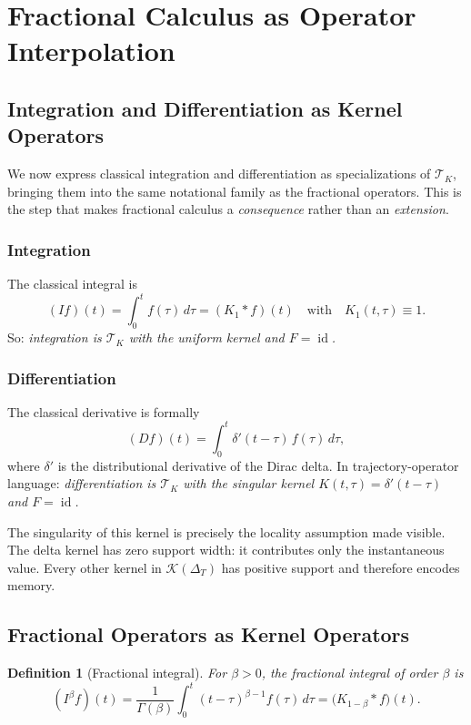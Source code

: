 \documentclass[12pt]{article}
\newtheorem{definition}[theorem]{Definition}
\DeclareMathOperator{\id}{id}
\newcommand{\Kcal}{\mathcal{K}}
\newcommand{\TK}{\mathcal{T}_K}
\begin{document}
\section{Fractional Calculus as Operator Interpolation}
\label{sec:fractal}

\subsection{Integration and Differentiation as Kernel Operators}

We now express classical integration and differentiation as specializations
of $\TK$, bringing them into the same notational family as the fractional
operators. This is the step that makes fractional calculus a
\emph{consequence} rather than an \emph{extension}.

\subsubsection{Integration}

The classical integral is
\[
  (If)(t) = \int_0^t f(\tau)\, d\tau = (K_1 * f)(t)
  \quad\text{with}\quad K_1(t,\tau) \equiv 1.
\]
So: \textit{integration is $\TK$ with the uniform kernel and $F = \id$.}

\subsubsection{Differentiation}

The classical derivative is formally
\[
  (Df)(t) = \int_0^t \delta'(t-\tau)\, f(\tau)\, d\tau,
\]
where $\delta'$ is the distributional derivative of the Dirac delta.
In trajectory-operator language: \textit{differentiation is $\TK$ with the
singular kernel $K(t,\tau) = \delta'(t-\tau)$ and $F = \id$.}

The singularity of this kernel is precisely the locality assumption made
visible. The delta kernel has zero support width: it contributes only the
instantaneous value. Every other kernel in $\Kcal(\Delta_T)$ has positive
support and therefore encodes memory.

\subsection{Fractional Operators as Kernel Operators}

\begin{definition}[Fractional integral]
For $\beta > 0$, the \emph{fractional integral of order $\beta$} is
\[
  (I^\beta f)(t) = \frac{1}{\Gamma(\beta)}\int_0^t (t-\tau)^{\beta-1} f(\tau)\, d\tau
  = \bigl(K_{1-\beta} * f\bigr)(t).
\]
\end{definition}
\end{document}
